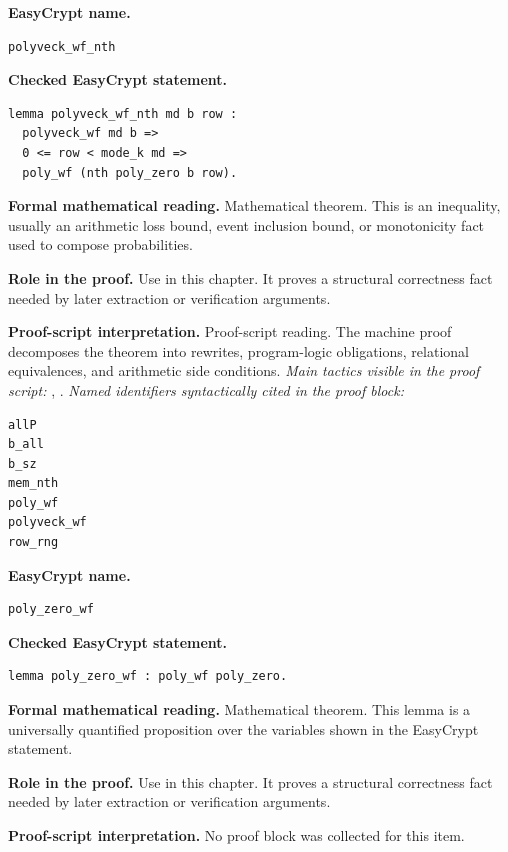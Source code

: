 \begin{formaltheorem}
\noindent\textbf{EasyCrypt name.}
\begin{lstlisting}[language=EasyCrypt,basicstyle=\ttfamily\scriptsize]
polyveck_wf_nth
\end{lstlisting}
\noindent\textbf{Checked EasyCrypt statement.}
\begin{lstlisting}[language=EasyCrypt,basicstyle=\ttfamily\scriptsize]
lemma polyveck_wf_nth md b row :
  polyveck_wf md b =>
  0 <= row < mode_k md =>
  poly_wf (nth poly_zero b row).
\end{lstlisting}
\noindent\textbf{Formal mathematical reading.}
Mathematical theorem. This is an inequality, usually an arithmetic loss bound, event inclusion bound, or monotonicity fact used to compose probabilities.

\noindent\textbf{Role in the proof.}
Use in this chapter. It proves a structural correctness fact needed by later extraction or verification arguments.

\noindent\textbf{Proof-script interpretation.}
Proof-script reading. The machine proof decomposes the theorem into rewrites, program-logic obligations, relational equivalences, and arithmetic side conditions.
\emph{Main tactics visible in the proof script:} , .
\emph{Named identifiers syntactically cited in the proof block:}
\begin{lstlisting}[language=EasyCrypt,basicstyle=\ttfamily\scriptsize]
allP
b_all
b_sz
mem_nth
poly_wf
polyveck_wf
row_rng
\end{lstlisting}

\end{formaltheorem}

\begin{formaltheorem}
\noindent\textbf{EasyCrypt name.}
\begin{lstlisting}[language=EasyCrypt,basicstyle=\ttfamily\scriptsize]
poly_zero_wf
\end{lstlisting}
\noindent\textbf{Checked EasyCrypt statement.}
\begin{lstlisting}[language=EasyCrypt,basicstyle=\ttfamily\scriptsize]
lemma poly_zero_wf : poly_wf poly_zero.
\end{lstlisting}
\noindent\textbf{Formal mathematical reading.}
Mathematical theorem. This lemma is a universally quantified proposition over the variables shown in the EasyCrypt statement.

\noindent\textbf{Role in the proof.}
Use in this chapter. It proves a structural correctness fact needed by later extraction or verification arguments.

\noindent\textbf{Proof-script interpretation.}
No proof block was collected for this item.

\end{formaltheorem}

